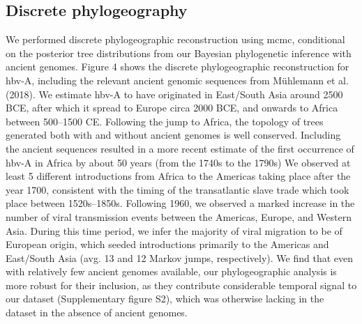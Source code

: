 \subsection{Discrete phylogeography}
We performed discrete phylogeographic reconstruction using \gls{mcmc}, conditional on the posterior tree distributions from our Bayesian phylogenetic inference with ancient genomes.
Figure 4 shows the discrete phylogeographic reconstruction for \gls{hbv}-A, including the relevant ancient genomic sequences from M\"uhlemann et al. (2018).
We estimate \gls{hbv}-A to have originated in East/South Asia around 2500 BCE, after which it spread to Europe circa 2000 BCE, and onwards to Africa between 500--1500 CE.
Following the jump to Africa, the topology of trees generated both with and without ancient genomes is well conserved.
Including the ancient sequences resulted in a more recent estimate of the first occurrence of \gls{hbv}-A in Africa by about 50 years (from the 1740s to the 1790s)
We observed at least 5 different introductions from Africa to the Americas taking place after the year 1700, consistent with the timing of the transatlantic slave trade which took place between 1520s--1850s.
Following 1960, we observed a marked increase in the number of viral transmission events between the Americas, Europe, and Western Asia.
During this time period, we infer the majority of viral migration to be of European origin, which seeded introductions primarily to the Americas and East/South Asia (avg. 13 and 12 Markov jumps, respectively).
We find that even with relatively few ancient genomes available, our phylogeographic analysis is more robust for their inclusion, as they contribute considerable temporal signal to our dataset (Supplementary figure S2), which was otherwise lacking in the dataset in the absence of ancient genomes.



